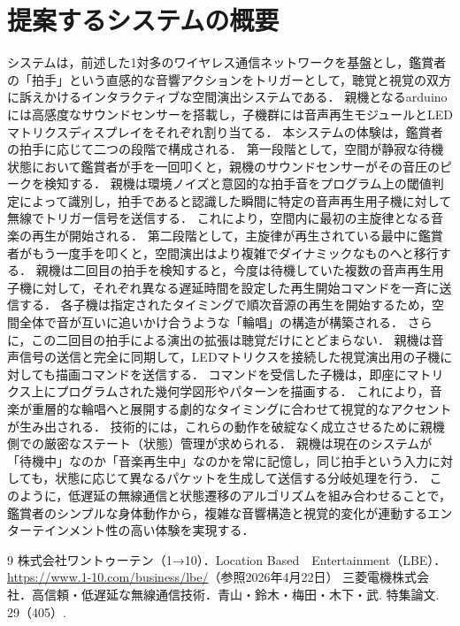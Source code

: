 \documentclass[uplatex,dvipdfmx]{jlreq}
\begin{document}
\section{提案するシステムの概要}
システムは，前述した1対多のワイヤレス通信ネットワークを基盤とし，鑑賞者の「拍手」という直感的な音響アクションをトリガーとして，聴覚と視覚の双方に訴えかけるインタラクティブな空間演出システムである．
親機となるarduinoには高感度なサウンドセンサーを搭載し，子機群には音声再生モジュールとLEDマトリクスディスプレイをそれぞれ割り当てる．
本システムの体験は，鑑賞者の拍手に応じて二つの段階で構成される．
第一段階として，空間が静寂な待機状態において鑑賞者が手を一回叩くと，親機のサウンドセンサーがその音圧のピークを検知する．
親機は環境ノイズと意図的な拍手音をプログラム上の閾値判定によって識別し，拍手であると認識した瞬間に特定の音声再生用子機に対して無線でトリガー信号を送信する．
これにより，空間内に最初の主旋律となる音楽の再生が開始される．
第二段階として，主旋律が再生されている最中に鑑賞者がもう一度手を叩くと，空間演出はより複雑でダイナミックなものへと移行する．
親機は二回目の拍手を検知すると，今度は待機していた複数の音声再生用子機に対して，それぞれ異なる遅延時間を設定した再生開始コマンドを一斉に送信する．
各子機は指定されたタイミングで順次音源の再生を開始するため，空間全体で音が互いに追いかけ合うような「輪唱」の構造が構築される．
さらに，この二回目の拍手による演出の拡張は聴覚だけにとどまらない．
親機は音声信号の送信と完全に同期して，LEDマトリクスを接続した視覚演出用の子機に対しても描画コマンドを送信する．
コマンドを受信した子機は，即座にマトリクス上にプログラムされた幾何学図形やパターンを描画する．
これにより，音楽が重層的な輪唱へと展開する劇的なタイミングに合わせて視覚的なアクセントが生み出される．
技術的には，これらの動作を破綻なく成立させるために親機側での厳密なステート（状態）管理が求められる．
親機は現在のシステムが「待機中」なのか「音楽再生中」なのかを常に記憶し，同じ拍手という入力に対しても，状態に応じて異なるパケットを生成して送信する分岐処理を行う．
このように，低遅延の無線通信と状態遷移のアルゴリズムを組み合わせることで，鑑賞者のシンプルな身体動作から，複雑な音響構造と視覚的変化が連動するエンターテインメント性の高い体験を実現する．
\begin{thebibliography}{9}
株式会社ワントゥーテン（1→10）．Location Based　Entertainment（LBE）．\url{https://www.1-10.com/business/lbe/}（参照2026年4月22日）
三菱電機株式会社．高信頼・低遅延な無線通信技術．青山・鈴木・梅田・木下・武. 特集論文. 29（405）.
\end{thebibliography}
\end{document}
